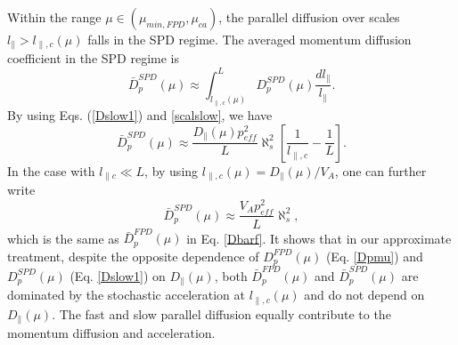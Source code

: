 \documentclass[preprint2,twocolumn,times,tighten]{aastex63}
\begin{document}
{Within the range $\mu \in (\mu_{min,FPD}, \mu_{ca})$, 
{the parallel diffusion over scales $l_\|>l_{\|,c} (\mu)$ falls in the SPD regime. 
The averaged momentum diffusion coefficient in the SPD regime is }
\begin{equation}
    \bar{D}_p^{SPD} (\mu)\approx \int_{l_{\|, c} (\mu)}^{L} D_p^{SPD} (\mu) \frac{dl_\|}{l_{\|}}.
\end{equation}
By using Eqs. (\ref{Dslow1}) and \eqref{scalslow}, we have 
\begin{equation}
    \bar{D}_p^{SPD} (\mu)\approx \frac{D_\| (\mu) p_{eff}^2}{L} \aleph_s^2 \left[\frac{1}{l_{\|, c}}-\frac{1}{L}\right].
\end{equation}
In the case with 
$l_{\| c}\ll L$, by using $l_{\|,c}(\mu) = D_\|(\mu)/V_A$, one can further write
\begin{equation}
    \bar{D}_p^{SPD} (\mu)\approx \frac{V_A p_{eff}^2}{ L} \aleph_s^2,
     \label{Dbars}
\end{equation}
which is the same as $\bar{D}_p^{FPD}(\mu)$ in Eq. \eqref{Dbarf}.
It shows that 
in our approximate treatment, { 
despite the opposite dependence of $D_p^{FPD}(\mu)$ (Eq. \eqref{Dpmu}) and $D_p^{SPD}(\mu)$ (Eq. \eqref{Dslow1}) on $D_\|(\mu)$, 
both $\bar{D}_p^{FPD}(\mu)$ and $\bar{D}_p^{SPD}(\mu)$ are dominated by the stochastic acceleration at $l_{\|,c}(\mu)$
and do not depend on $D_\|(\mu)$. 
The 
fast and slow parallel diffusion equally contribute to the momentum diffusion and acceleration.} 



}
\end{document}

